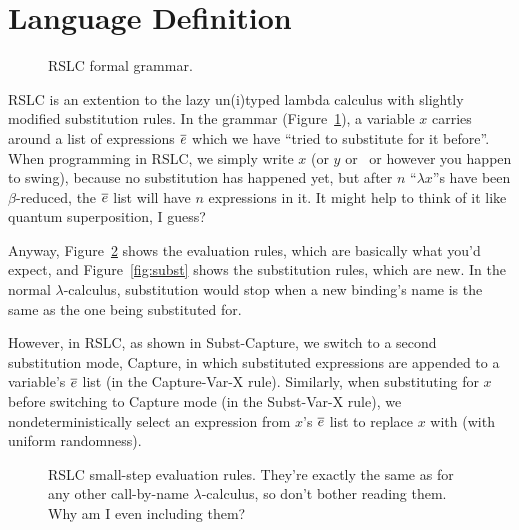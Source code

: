 \documentclass[10pt]{sigplanconf}
\begin{document}
\section{Language Definition}

\begin{figure}[t]
	\Grammar
	\caption{RSLC formal grammar.}
	\label{fig:grammar}
\end{figure}

RSLC is an extention to the lazy un(i)typed lambda calculus with slightly modified substitution rules. In the grammar (Figure~\ref{fig:grammar}), a variable $x$ carries around a list of expressions $\overline{e}$ which we have ``tried to substitute for it before''.
When programming in RSLC, we simply write $x$ (or $y$ or \Neptune~or however you happen to swing), because no substitution has happened yet, but after $n$ ``$\lambda x$''s have been $\beta$-reduced, the $\overline{e}$ list will have $n$ expressions in it.
It might help to think of it like quantum superposition, I guess?

Anyway, Figure~\ref{fig:eval} shows the evaluation rules, which are basically what you'd expect, and Figure~\ref{fig:subst} shows the substitution rules, which are new.
In the normal $\lambda$-calculus, substitution would stop when a new binding's name is the same as the one being substituted for.

However, in RSLC, as shown in {\sc Subst-Capture}, we switch to a second substitution mode, {\sc Capture}, in which substituted expressions are appended to a variable's $\overline{e}$ list (in the {\sc Capture-Var-X} rule).
Similarly, when substituting for $x$ before switching to {\sc Capture} mode (in the {\sc Subst-Var-X} rule), we nondeterministically select an expression from $x$'s $\overline{e}$ list to replace $x$ with (with uniform randomness).

\begin{figure}[t]
	\TypeRules{
		\EvalLam \qquad \EvalApp \qquad \EvalVar \\
		\EvalZero \qquad \EvalSucA \qquad \EvalSucB \\
		\EvalCaseA \\ \EvalCaseB \\ \EvalLet
	}
	\caption{RSLC small-step evaluation rules. They're exactly the same as for any other call-by-name $\lambda$-calculus, so don't bother reading them. Why am I even including them?}
	\label{fig:eval}
\end{figure}
\end{document}
